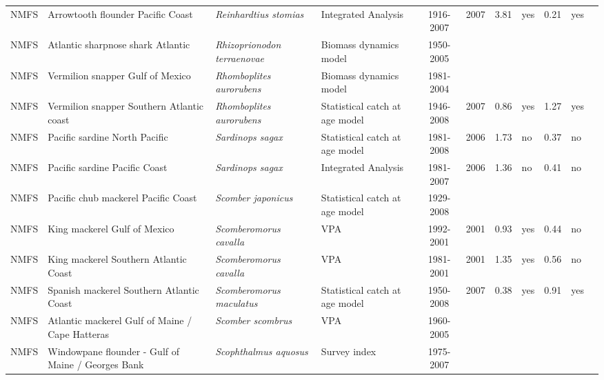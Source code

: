 \begin{longtable}{p{1.8cm}p{3.5cm}p{3.5cm}p{3cm}cccp{0.9cm}cp{0.9cm}c}
  NMFS & Arrowtooth flounder Pacific Coast & \textit{Reinhardtius stomias} & Integrated Analysis & 1916-2007 & 2007 & 3.81 & yes & 0.21 & yes & \cite{NWFSC-ARFLOUNDPCOAST-2007-Arrowtooth flounder.pdf} \\ 
  NMFS & Atlantic sharpnose shark Atlantic & \textit{Rhizoprionodon terraenovae} & Biomass dynamics model & 1950-2005 &  &  &  &  &  & \cite{SmallcoastalAtl2007-SEFSC.pdf} \\ 
  NMFS & Vermilion snapper Gulf of Mexico & \textit{Rhomboplites aurorubens} & Biomass dynamics model & 1981-2004 &  &  &  &  &  & \cite{JENSEN_VSNAPGM_2006.pdf} \\ 
  NMFS & Vermilion snapper Southern Atlantic coast & \textit{Rhomboplites aurorubens} & Statistical catch at age model & 1946-2008 & 2007 & 0.86 & yes & 1.27 & yes & \cite{2008_SEDAR_VermillionSnapper_Satl.pdf} \\ 
  NMFS & Pacific sardine North Pacific & \textit{Sardinops sagax} & Statistical catch at age model & 1981-2008 & 2006 & 1.73 & no & 0.37 & no & \cite{2008 pac sardine.pdf} \\ 
  NMFS & Pacific sardine Pacific Coast & \textit{Sardinops sagax} & Integrated Analysis & 1981-2007 & 2006 & 1.36 & no & 0.41 & no & \cite{NOAA-TM-NMFS-SWFSC-413.pdf} \\ 
  NMFS & Pacific chub mackerel Pacific Coast & \textit{Scomber japonicus} & Statistical catch at age model & 1929-2008 &  &  &  &  &  & \cite{PFMC_2008_CPS_SAFE_App2_PMackerel.pdf} \\ 
  NMFS & King mackerel Gulf of Mexico & \textit{Scomberomorus cavalla} & VPA & 1992-2001 & 2001 & 0.93 & yes & 0.44 & no & \cite{JENSEN_KMACKGMSATLC_2004.pdf} \\ 
  NMFS & King mackerel Southern Atlantic Coast & \textit{Scomberomorus cavalla} & VPA & 1981-2001 & 2001 & 1.35 & yes & 0.56 & no & \cite{JENSEN_KMACKGMSATLC_2004.pdf} \\ 
  NMFS & Spanish mackerel Southern Atlantic Coast & \textit{Scomberomorus maculatus} & Statistical catch at age model & 1950-2008 & 2007 & 0.38 & yes & 0.91 & yes & \cite{JENSEN_SPANMACKSATLC_2008.pdf} \\ 
  NMFS & Atlantic mackerel Gulf of Maine / Cape Hatteras & \textit{Scomber scombrus} & VPA & 1960-2005 &  &  &  &  &  & \cite{AtlanticMackerel2005.pdf} \\ 
  NMFS & Windowpane flounder - Gulf of Maine / Georges Bank & \textit{Scophthalmus aquosus} & Survey index & 1975-2007 &  &  &  &  &  & \cite{garm3p.pdf} \\ 

\end{longtable}

